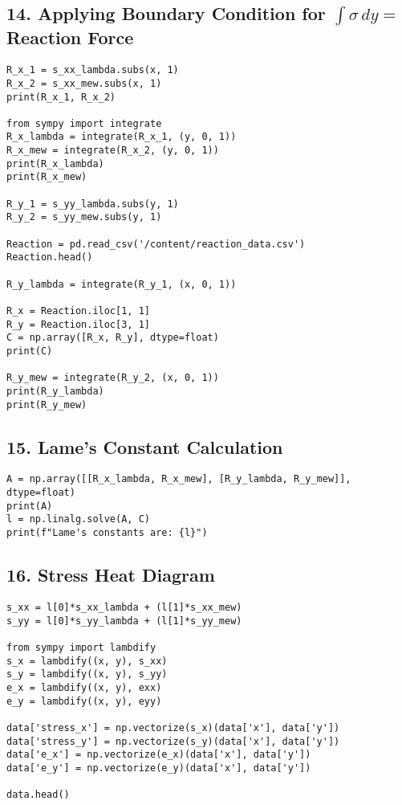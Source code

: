 \documentclass{article}
\begin{document}
\subsection*{14. Applying Boundary Condition for \( \int \sigma \, dy = \) Reaction Force}
\begin{lstlisting}[style=python]
R_x_1 = s_xx_lambda.subs(x, 1)
R_x_2 = s_xx_mew.subs(x, 1)
print(R_x_1, R_x_2)

from sympy import integrate
R_x_lambda = integrate(R_x_1, (y, 0, 1))
R_x_mew = integrate(R_x_2, (y, 0, 1))
print(R_x_lambda)
print(R_x_mew)

R_y_1 = s_yy_lambda.subs(y, 1)
R_y_2 = s_yy_mew.subs(y, 1)

Reaction = pd.read_csv('/content/reaction_data.csv')
Reaction.head()

R_y_lambda = integrate(R_y_1, (x, 0, 1))

R_x = Reaction.iloc[1, 1]
R_y = Reaction.iloc[3, 1]
C = np.array([R_x, R_y], dtype=float)
print(C)

R_y_mew = integrate(R_y_2, (x, 0, 1))
print(R_y_lambda)
print(R_y_mew)
\end{lstlisting}

\subsection*{15. Lame's Constant Calculation}
\begin{lstlisting}[style=python]
A = np.array([[R_x_lambda, R_x_mew], [R_y_lambda, R_y_mew]], dtype=float)
print(A)
l = np.linalg.solve(A, C)
print(f"Lame's constants are: {l}")
\end{lstlisting}

\subsection*{16. Stress Heat Diagram}
\begin{lstlisting}[style=python]
s_xx = l[0]*s_xx_lambda + (l[1]*s_xx_mew)
s_yy = l[0]*s_yy_lambda + (l[1]*s_yy_mew)

from sympy import lambdify
s_x = lambdify((x, y), s_xx)
s_y = lambdify((x, y), s_yy)
e_x = lambdify((x, y), exx)
e_y = lambdify((x, y), eyy)

data['stress_x'] = np.vectorize(s_x)(data['x'], data['y'])
data['stress_y'] = np.vectorize(s_y)(data['x'], data['y'])
data['e_x'] = np.vectorize(e_x)(data['x'], data['y'])
data['e_y'] = np.vectorize(e_y)(data['x'], data['y'])

data.head()
\end{lstlisting}
\end{document}
